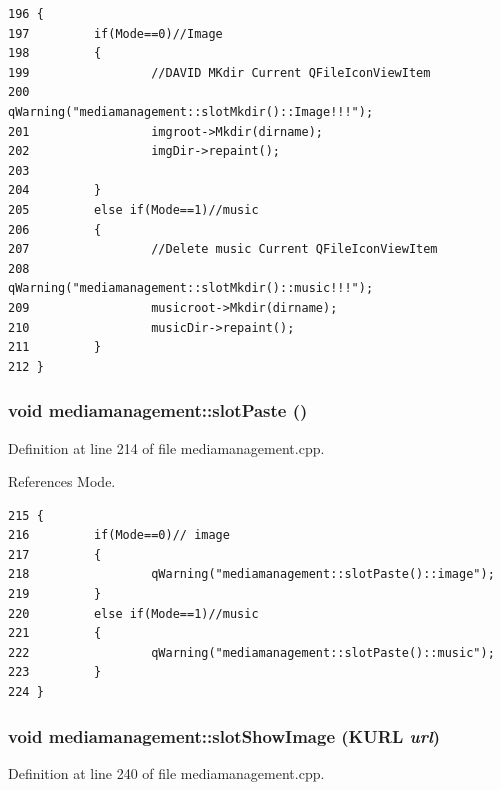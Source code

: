 \footnotesize\begin{verbatim}196 {       
197         if(Mode==0)//Image
198         {
199                 //DAVID MKdir Current QFileIconViewItem
200                 qWarning("mediamanagement::slotMkdir()::Image!!!");
201                 imgroot->Mkdir(dirname);
202                 imgDir->repaint();
203                 
204         }
205         else if(Mode==1)//music
206         {
207                 //Delete music Current QFileIconViewItem
208                 qWarning("mediamanagement::slotMkdir()::music!!!");
209                 musicroot->Mkdir(dirname);
210                 musicDir->repaint();
211         }
212 }
\end{verbatim}\normalsize 
{}
\subsubsection{\setlength{\rightskip}{0pt plus 5cm}void mediamanagement::slot\-Paste ()\hspace{0.3cm}{\tt  [slot]}}\label{classmediamanagement_mediamanagementi4}




Definition at line 214 of file mediamanagement.cpp.

References Mode.



\footnotesize\begin{verbatim}215 {
216         if(Mode==0)// image 
217         {
218                 qWarning("mediamanagement::slotPaste()::image");
219         }
220         else if(Mode==1)//music
221         {
222                 qWarning("mediamanagement::slotPaste()::music");
223         }
224 }
\end{verbatim}\normalsize 
{}
\subsubsection{\setlength{\rightskip}{0pt plus 5cm}void mediamanagement::slot\-Show\-Image (KURL {\em url})\hspace{0.3cm}{\tt  [slot]}}\label{classmediamanagement_mediamanagementi5}




Definition at line 240 of file mediamanagement.cpp.

